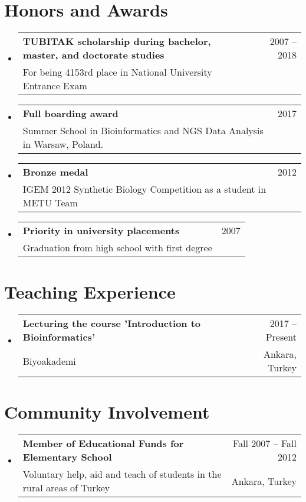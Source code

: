 \documentclass[A4,11pt]{article}
\makeatletter
\newcommand{\CVSubheading}[4]{
  \vspace{-2pt}\item
    \begin{tabular*}{0.97\textwidth}[t]{l@{\extracolsep{\fill}}r}
      \textbf{#1} & #2 \\
      \small#3 & \small #4 \\
    \end{tabular*}\vspace{-7pt}
}
\newcommand{\CVSubHeadingListStart}{\begin{itemize}[leftmargin=0.5cm, label={}]}
\newcommand{\CVSubHeadingListEnd}{\end{itemize}}
\makeatother
\begin{document}
\section{Honors and Awards}
  \CVSubHeadingListStart
    \CVSubheading
      {TUBITAK scholarship during bachelor, master, and doctorate studies}{2007 -- 2018}
      {For being 4153rd place in National University Entrance Exam}{}
    \CVSubheading
      {Full boarding award}{2017}
      {Summer School in Bioinformatics and NGS Data Analysis in Warsaw, Poland.}{}
    \CVSubheading
      {Bronze medal }{ 2012}
      {IGEM 2012 Synthetic Biology Competition as a student in METU Team}{}
    \CVSubheading
      {Priority in university placements}{2007}
      {Graduation from high school with first degree}{}
  \CVSubHeadingListEnd

\begin{comment}
Section is here as it applied to my application for positions in academia. 
Remember to tailor the resume for to the position.
\end{comment}

\section{Teaching Experience}
  \CVSubHeadingListStart
    \CVSubheading
      {Lecturing the course 'Introduction to Bioinformatics'}{2017 -- Present}
      {Biyoakademi}{Ankara, Turkey}
  \CVSubHeadingListEnd

\section{Community Involvement}
  \CVSubHeadingListStart
    \CVSubheading
      {Member of Educational Funds for Elementary School}{Fall 2007 -- Fall 2012}
      {Voluntary help, aid and teach of students in the rural areas of Turkey}{Ankara, Turkey}
  \CVSubHeadingListEnd

\begin{comment}
This section is compressed from the various skills sections that Euro CV
recommends.
\end{comment}
\end{document}
